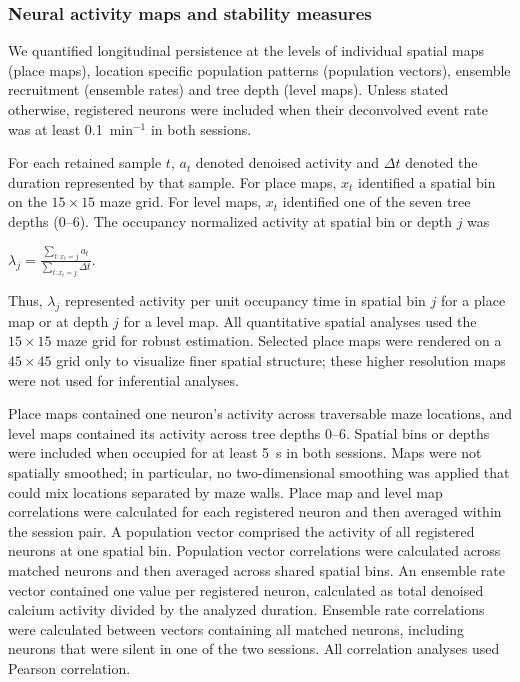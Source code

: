 \documentclass[fleqn,10pt]{wlscirep}
\begin{document}
\subsubsection*{Neural activity maps and stability measures}

We quantified longitudinal persistence at the levels of individual spatial maps (place maps), location specific population patterns (population vectors), ensemble recruitment (ensemble rates) and tree depth (level maps). Unless stated otherwise, registered neurons were included when their deconvolved event rate was at least 0.1~min$^{-1}$ in both sessions.

For each retained sample $t$, $a_t$ denoted denoised activity and $\Delta t$ denoted the duration represented by that sample. For place maps, $x_t$ identified a spatial bin on the $15\times15$ maze grid. For level maps, $x_t$ identified one of the seven tree depths (0--6). The occupancy normalized activity at spatial bin or depth $j$ was
\begin{center}
\(
\lambda_j =
\frac{\sum_{t:x_t=j} a_t}
{\sum_{t:x_t=j} \Delta t}.
\)  
\end{center}
Thus, $\lambda_j$ represented activity per unit occupancy time in spatial bin $j$ for a place map or at depth $j$ for a level map. All quantitative spatial analyses used the $15\times15$ maze grid for robust estimation. Selected place maps were rendered on a $45\times45$ grid only to visualize finer spatial structure; these higher resolution maps were not used for inferential analyses.

Place maps contained one neuron's activity across traversable maze locations, and level maps contained its activity across tree depths 0--6. Spatial bins or depths were included when occupied for at least 5~s in both sessions. Maps were not spatially smoothed; in particular, no two-dimensional smoothing was applied that could mix locations separated by maze walls. Place map and level map correlations were calculated for each registered neuron and then averaged within the session pair. A population vector comprised the activity of all registered neurons at one spatial bin. Population vector correlations were calculated across matched neurons and then averaged across shared spatial bins. An ensemble rate vector contained one value per registered neuron, calculated as total denoised calcium activity divided by the analyzed duration. Ensemble rate correlations were calculated between vectors containing all matched neurons, including neurons that were silent in one of the two sessions. All correlation analyses used Pearson correlation.
\end{document}
